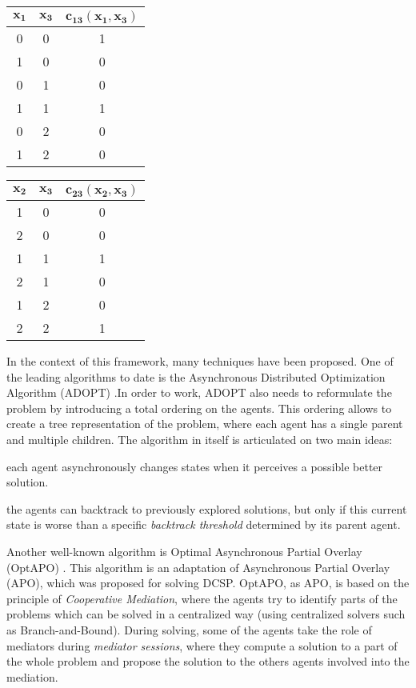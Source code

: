 \begin{center}
\begin{tabular}{ccc}
\toprule
$\boldsymbol{x_1}$	& $\boldsymbol{x_3}$ & $\boldsymbol{c_{13}(x_1,x_3)}$\\
\midrule
0 & 0	& 1\\
1 & 0	& 0\\
0 & 1	& 0\\
1 & 1	& 1\\
0 & 2	& 0\\
1 & 2	& 0\\
\bottomrule
\end{tabular}
\quad
\begin{tabular}{ccc}
\toprule
$\boldsymbol{x_2}$	& $\boldsymbol{x_3}$ & $\boldsymbol{c_{23}(x_2,x_3)}$\\
\midrule
1 & 0	& 0\\
2 & 0	& 0\\
1 & 1	& 1\\
2 & 1	& 0\\
1 & 2	& 0\\
2 & 2	& 1\\
\bottomrule
\end{tabular}
\end{center}

In the context of this framework, many techniques have been proposed. One of the leading algorithms to date is the Asynchronous Distributed Optimization Algorithm (ADOPT) \cite{Modi06adopt:asynchronous}.In order to work, ADOPT also needs to reformulate the problem by introducing a total ordering on the agents. This ordering allows to create a tree representation of the problem, where each agent has a single parent and multiple children. The algorithm in itself is articulated on two main ideas:

\begin{compactitem}
\item each agent asynchronously changes states when it perceives a possible better solution.
\item the agents can backtrack to previously explored solutions, but only if this current state is worse than a specific \emph{backtrack threshold} determined by its parent agent.
\end{compactitem}

Another well-known algorithm is Optimal Asynchronous Partial Overlay (OptAPO) \cite{Mailler-355}. This algorithm is an adaptation of Asynchronous Partial Overlay (APO), which was proposed for solving DCSP. OptAPO, as APO, is based on the principle of \emph{Cooperative Mediation}, where the agents try to identify parts of the problems which can be solved in a centralized way (using centralized solvers such as Branch-and-Bound). During solving, some of the agents take the role of mediators during \emph{mediator sessions}, where they compute a solution to a part of the whole problem and propose the solution to the others agents involved into the mediation.

